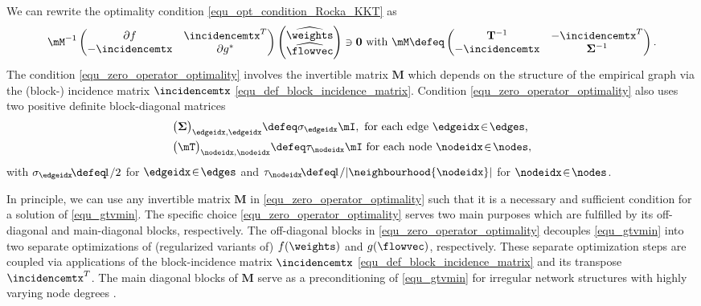 \documentclass[lettersize,journal]{IEEEtran}
\begin{document}
We can rewrite the optimality condition \eqref{equ_opt_condition_Rocka_KKT} as \cite{pock_chambolle_2016}
\begin{equation}
\label{equ_zero_operator_optimality}
\mM^{-1}   \begin{pmatrix} \partial f &  \incidencemtx^{T}   \\  -\incidencemtx &  \partial  g^{*} \end{pmatrix}
\begin{pmatrix} \widehat{\weights} \\ \widehat{\flowvec} \end{pmatrix} \ni \mathbf{0} \mbox{ with } 
\mM \defeq \begin{pmatrix} \mathbf{T}^{-1} & - \incidencemtx^{T} \\  -\incidencemtx & {\bf \Sigma}^{-1} \end{pmatrix}.
\end{equation}
The condition \eqref{equ_zero_operator_optimality} involves the invertible matrix $\mathbf{M}$ 
which depends on the structure of the empirical graph via the (block-) incidence matrix $\incidencemtx$ \eqref{equ_def_block_incidence_matrix}. 
Condition \eqref{equ_zero_operator_optimality} also uses two positive definite block-diagonal matrices %
\begin{align} %
\nonumber
& \big( {\bf \Sigma} \big)_{\edgeidx,\edgeidx} \defeq \sigma_{\edgeidx} \mI, \mbox{ for each edge } \edgeidx\!\in\!\edges  \mbox{, }\nonumber \\
& \big(\mT\big)_{\nodeidx,\nodeidx}  \defeq \tau_\nodeidx \mI \mbox{ for each node } \nodeidx\!\in\!\nodes,
\end{align}
with $\sigma_{\edgeidx}\!\defeq\!1/2$ for $\edgeidx\!\in\!\edges$ and $\tau_\nodeidx \!\defeq\!1/ | \neighbourhood{\nodeidx}|$  for $\nodeidx\!\in\!\nodes$. 

In principle, we can use any invertible matrix $\mathbf{M}$ in \eqref{equ_zero_operator_optimality} such that it 
is a necessary and sufficient condition for a solution of \eqref{equ_gtvmin}. The specific choice \eqref{equ_zero_operator_optimality} 
serves two main purposes which are fulfilled by its off-diagonal and main-diagonal blocks, respectively. 
The off-diagonal blocks in \eqref{equ_zero_operator_optimality} decouples 
\eqref{equ_gtvmin} into two separate optimizations of (regularized variants of) $f(\weights)$ and $g(\flowvec)$, 
respectively. These separate optimization steps are coupled via applications of the block-incidence 
matrix $\incidencemtx$ \eqref{equ_def_block_incidence_matrix} and its transpose $\incidencemtx^{T}$. 
The main diagonal blocks of $\mathbf{M}$ serve as a preconditioning of \eqref{equ_gtvmin} for irregular network structures with 
highly varying node degrees \cite{PrecPockChambolle2011}. 
\end{document}
